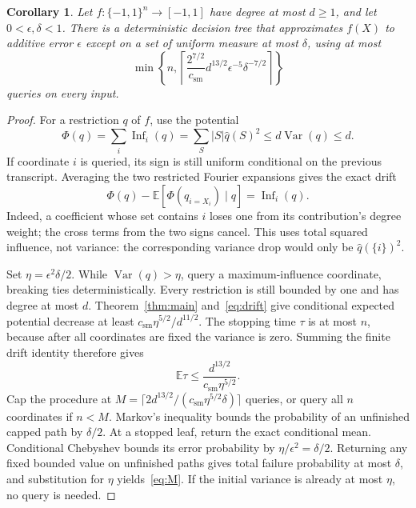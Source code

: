 \documentclass[11pt]{article}
\newtheorem{corollary}[theorem]{Corollary}
\theoremstyle{remark}\newtheorem{remark}[theorem]{Remark}
\newcommand{\E}{\mathbb E}
\newcommand{\Var}{\operatorname{Var}}
\newcommand{\Inf}{\operatorname{Inf}}
\newcommand{\csm}{c_{\mathrm{sm}}}
\newcommand{\Q}{\{-1,1\}^n}
\begin{document}
\begin{corollary}\label{cor:query}
Let $f:\Q\to[-1,1]$ have degree at most $d\ge1$, and let $0<\epsilon,\delta<1$. There is a deterministic decision tree that approximates $f(X)$ to additive error $\epsilon$ except on a set of uniform measure at most $\delta$, using at most
\begin{equation}\label{eq:M}
 \min\!\left\{n,\left\lceil\frac{2^{7/2}}{\csm}
       d^{13/2}\epsilon^{-5}\delta^{-7/2}\right\rceil\right\}
\end{equation}
queries on every input.
\end{corollary}
\begin{proof}
For a restriction $q$ of $f$, use the potential
\[
 \Phi(q)=\sum_i\Inf_i(q)=\sum_S|S|\widehat q(S)^2
               \le d\Var(q)\le d.
\]
If coordinate $i$ is queried, its sign is still uniform conditional on the previous transcript. Averaging the two restricted Fourier expansions gives the exact drift
\begin{equation}\label{eq:drift}
 \Phi(q)-\E[\Phi(q_{i=X_i})\mid q]=\Inf_i(q).
\end{equation}
Indeed, a coefficient whose set contains $i$ loses one from its contribution's degree weight; the cross terms from the two signs cancel. This uses total squared influence, not variance: the corresponding variance drop would only be $\widehat q(\{i\})^2$.

Set $\eta=\epsilon^2\delta/2$. While $\Var(q)>\eta$, query a maximum-influence coordinate, breaking ties deterministically. Every restriction is still bounded by one and has degree at most $d$. Theorem~\ref{thm:main} and~\eqref{eq:drift} give conditional expected potential decrease at least $\csm\eta^{5/2}/d^{11/2}$. The stopping time $\tau$ is at most $n$, because after all coordinates are fixed the variance is zero. Summing the finite drift identity therefore gives
\[
 \E\tau\le\frac{d^{13/2}}{\csm\eta^{5/2}}.
\]
Cap the procedure at $M=\lceil2d^{13/2}/(\csm\eta^{5/2}\delta)\rceil$ queries, or query all $n$ coordinates if $n<M$. Markov's inequality bounds the probability of an unfinished capped path by $\delta/2$. At a stopped leaf, return the exact conditional mean. Conditional Chebyshev bounds its error probability by $\eta/\epsilon^2=\delta/2$. Returning any fixed bounded value on unfinished paths gives total failure probability at most $\delta$, and substitution for $\eta$ yields~\eqref{eq:M}. If the initial variance is already at most $\eta$, no query is needed.
\end{proof}
\end{document}
